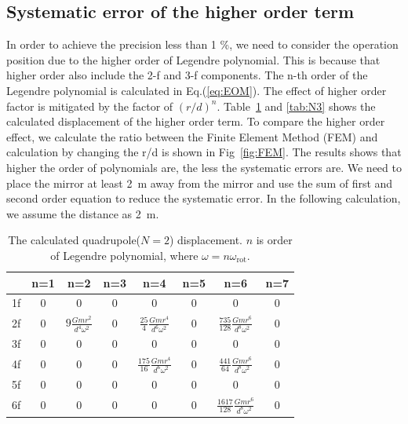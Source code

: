 \documentclass[%
 reprint,
superscriptaddress,
 amsmath,amssymb,
 aps,
]{revtex4-1}
\begin{document}
\subsection{Systematic error of the higher order term}
In order to achieve the precision less than 1 \%, we need to consider the operation position due to the higher order of Legendre polynomial. This is because that higher order also include the 2-f and 3-f components. The n-th order of the Legendre polynomial is calculated in Eq.(\ref{eq:EOM}). The effect of higher order factor is mitigated by the factor of $(r/d)^n$. Table~\ref{tab:N2} and \ref{tab:N3} shows the calculated displacement of the higher order term. To compare the higher order effect, we calculate the ratio between the Finite Element Method (FEM) and calculation by changing the r/d is shown in Fig~\ref{fig:FEM}. The results shows that higher the order of polynomials are, the less the systematic errors are. We need to place the mirror at least 2~m away from the mirror and use the sum of first and second order equation to reduce the systematic error. In the following calculation, we assume the distance as 2~m. 

\begin{table}
\begin{center}
\caption{The calculated quadrupole($N=2$) displacement. $n$ is order of Legendre polynomial, where $\omega=n\omega_{\mathrm{rot}}$. \label{tab:N2}}
\footnotesize
\begin{tabular}{cccccccc}
\hline
& n=1 & n=2& n=3 &n=4&n=5&n=6&n=7 \\
\hline
1f&0&0&0&0&0&0&0 \\
2f&0&$9 \frac{Gmr^2}{d^4\omega^2}$&0&$\frac{25}{4} \frac{Gmr^4}{d^6\omega^2}$&0&$\frac{735}{128} \frac{Gmr^6}{d^8\omega^2}$&0  \\
3f&0&0&0&0&0&0&0\\
4f&0&0&0&$\frac{175}{16} \frac{Gmr^4}{d^6\omega^2}$&0& $\frac{441}{64} \frac{Gmr^6}{d^8\omega^2}$&0 \\
5f&0&0&0&0&0&0&0 \\
6f&0&0&0&0&0&$\frac{1617}{128} \frac{Gmr^6}{d^8\omega^2}$&0  \\
\hline
\end{tabular}
\end{center}
\end{table}
\end{document}

